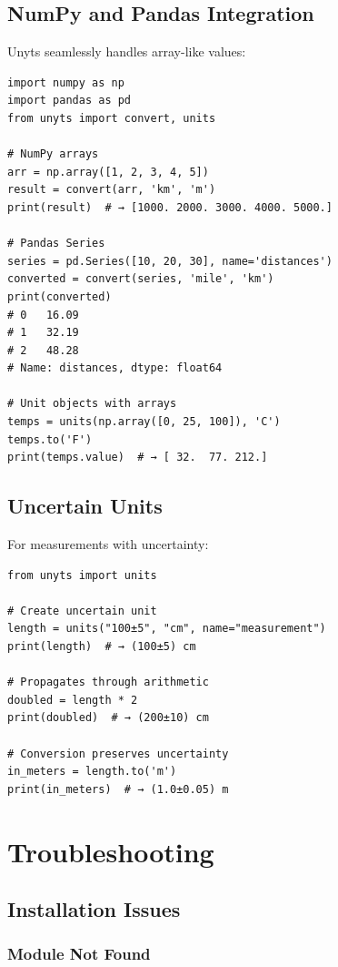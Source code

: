 \documentclass[11pt,a4paper]{report}
\begin{document}
\section{NumPy and Pandas Integration}

Unyts seamlessly handles array-like values:

\begin{lstlisting}[style=pythonstyle]
import numpy as np
import pandas as pd
from unyts import convert, units

# NumPy arrays
arr = np.array([1, 2, 3, 4, 5])
result = convert(arr, 'km', 'm')
print(result)  # → [1000. 2000. 3000. 4000. 5000.]

# Pandas Series
series = pd.Series([10, 20, 30], name='distances')
converted = convert(series, 'mile', 'km')
print(converted)
# 0   16.09
# 1   32.19
# 2   48.28
# Name: distances, dtype: float64

# Unit objects with arrays
temps = units(np.array([0, 25, 100]), 'C')
temps.to('F')
print(temps.value)  # → [ 32.  77. 212.]
\end{lstlisting}

\section{Uncertain Units}

For measurements with uncertainty:

\begin{lstlisting}[style=pythonstyle]
from unyts import units

# Create uncertain unit
length = units("100±5", "cm", name="measurement")
print(length)  # → (100±5) cm

# Propagates through arithmetic
doubled = length * 2
print(doubled)  # → (200±10) cm

# Conversion preserves uncertainty
in_meters = length.to('m')
print(in_meters)  # → (1.0±0.05) m
\end{lstlisting}


\chapter{Troubleshooting}

\section{Installation Issues}

\subsection{Module Not Found}
\end{document}

